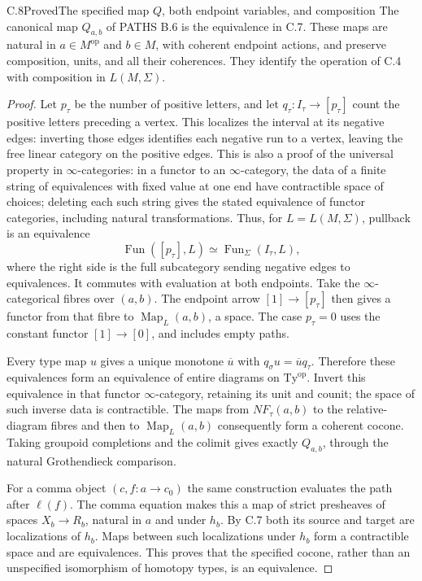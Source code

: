 \begin{claim}{C.8}{Proved}{The specified map $Q$, both endpoint variables, and composition}
The canonical map $Q_{a,b}$ of PATHS B.6 is the equivalence in C.7.
These maps are natural in $a\in M^{\mathrm{op}}$ and $b\in M$,
with coherent endpoint actions, and preserve composition, units,
and all their coherences. They identify the operation of C.4 with
composition in $L(M,\Sigma)$.
\end{claim}
\begin{proof}
Let $p_\tau$ be the number of positive letters, and let
$q_\tau:I_\tau\to[p_\tau]$ count the positive letters preceding
a vertex. This localizes the interval at its negative edges:
inverting those edges identifies each negative run to a vertex,
leaving the free linear category on the positive edges. This is
also a proof of the universal property in $\infty$-categories:
in a functor to an $\infty$-category, the data of a finite string of
equivalences with fixed value at one end have contractible space of
choices; deleting each such string gives the stated equivalence
of functor categories, including natural transformations.
Thus, for $L=L(M,\Sigma)$, pullback is an equivalence
\[
 \operatorname{Fun}([p_\tau],L)\simeq
 \operatorname{Fun}_\Sigma(I_\tau,L),
\]
where the right side is the full subcategory sending negative edges
to equivalences. It commutes with evaluation at both endpoints.
Take the $\infty$-categorical fibres over $(a,b)$. The endpoint
arrow $[1]\to[p_\tau]$ then gives a functor from that fibre to
$\operatorname{Map}_L(a,b)$, a space. The case $p_\tau=0$ uses
the constant functor $[1]\to[0]$, and includes empty paths.

Every type map $u$ gives a unique monotone $\overline u$ with
$q_\sigma u=\overline u q_\tau$. Therefore these equivalences
form an equivalence of entire diagrams on $\mathrm{Ty}^{\mathrm{op}}$.
Invert this equivalence in that functor $\infty$-category, retaining
its unit and counit; the space of such inverse data is contractible.
The maps from $NF_\tau(a,b)$ to the relative-diagram fibres and
then to $\operatorname{Map}_L(a,b)$ consequently form a coherent
cocone. Taking groupoid completions and the colimit gives exactly
$Q_{a,b}$, through the natural Grothendieck comparison.

For a comma object $(c,f:a\to c_0)$ the same construction evaluates
the path after $\ell(f)$. The comma equation makes this a map of
strict presheaves of spaces $X_b\to R_b$, natural in $a$ and
under $h_b$. By C.7 both its source and target are localizations of
$h_b$. Maps between such localizations under $h_b$ form a
contractible space and are equivalences. This proves that the
specified cocone, rather than an unspecified isomorphism of
homotopy types, is an equivalence.


\end{proof}
